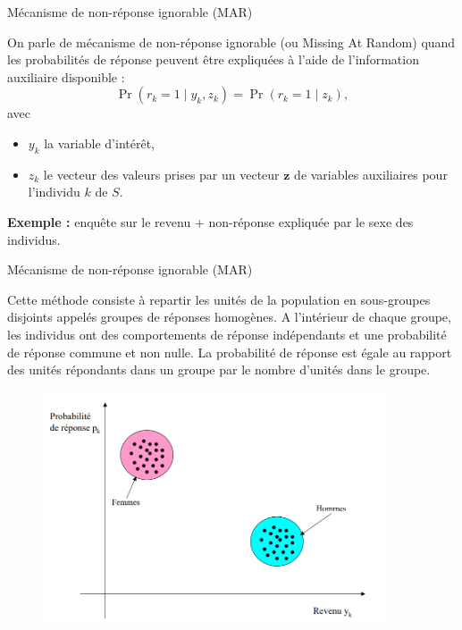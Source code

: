 \begin{frame}{Mécanisme de non-réponse ignorable (MAR)}
	
On parle de mécanisme de non-réponse ignorable (ou Missing At Random) quand les probabilités de réponse peuvent être expliquées à l’aide de l’information auxiliaire disponible : 
\[
\Pr(r_k = 1 \mid y_k, z_k) = \Pr(r_k = 1 \mid z_k),
\]
avec 
\begin{itemize}
	\item $y_k$ la variable d’intérêt,
	\item $z_k$ le vecteur des valeurs prises par un vecteur $\mathbf{z}$ de variables auxiliaires pour l’individu $k$ de $S$.
\end{itemize}

\textbf{Exemple :} enquête sur le revenu + non-réponse expliquée par le sexe des individus.

\end{frame}

\begin{frame}{Mécanisme de non-réponse ignorable (MAR)}

	
	Cette méthode consiste à repartir les unités de la population en
	sous-groupes disjoints appelés groupes de réponses homogènes. A
	l’intérieur de chaque groupe, les individus ont des comportements de
	réponse indépendants et une probabilité de réponse commune et non nulle.
	La probabilité de réponse est égale au rapport des unités répondants dans
	un groupe par le nombre d’unités dans le groupe.
	
	
\end{frame}

\begin{frame}{}
	\begin{figure}[h]
		\centering
		\includegraphics[width=0.9\textwidth]{img/sex.png}
	\end{figure}
\end{frame}

